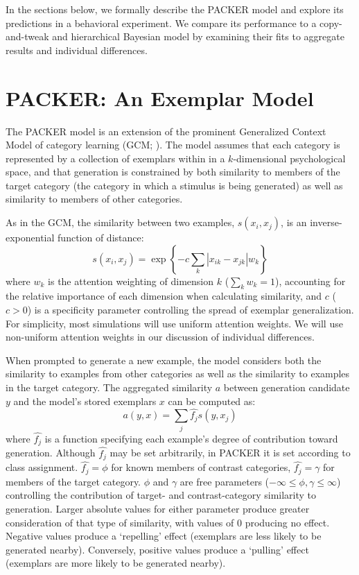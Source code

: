 \documentclass[10pt,letterpaper]{article}
\begin{document}
In the sections below, we formally describe the PACKER model and explore its predictions in a behavioral experiment. We compare its performance to a copy-and-tweak and hierarchical Bayesian model by examining their fits to aggregate results and individual differences.

\section{PACKER: An Exemplar Model}

The PACKER model is an extension of the prominent Generalized Context Model of category learning (GCM; \citealp{nosofsky1984choice}). The model assumes that each category is represented by a collection of exemplars within in a $k$-dimensional psychological space, and that generation is constrained by both similarity to members of the target category (the category in which a stimulus is being generated) as well as similarity to members of other categories. 

As in the GCM, the similarity between two examples, $s\left(x_i, x_j\right)$, is an inverse-exponential function of distance:
\begin{equation}
  s\left(x_i,x_j\right) = \exp \left\{ -c \sum_{k}{ \left| x_{ik} - x_{jk} \right|}w_k \right\}
  \label{eq:similarity}
\end{equation}
where $w_k$ is the attention weighting of dimension $k$ ($\sum_k{w_k} = 1$), accounting for the relative importance of each dimension when calculating similarity, and $c$ ($c>0$) is a specificity parameter controlling the spread of exemplar generalization. For simplicity, most simulations will use uniform attention weights. We will use non-uniform attention weights in our discussion of individual differences.  


When prompted to generate a new example, the model considers both the similarity to examples from other categories as well as the similarity to examples in the target category. The aggregated similarity $a$ between generation candidate $y$ and the model's stored exemplars $x$ can be computed as:
\begin{equation}
  a(y, x) = \sum_j{\hat{f_j} s(y, x_j)}
  \label{eq:packer-ss}
\end{equation}
where $\hat{f_j}$ is a function specifying each example's degree of contribution toward generation. Although $\hat{f_j}$ may be set arbitrarily, in PACKER it is set according to class assignment. $\hat{f_j} = \phi$ for known members of contrast categories, $\hat{f_j} = \gamma$ for members of the target category. $\phi$ and $\gamma$ are free parameters ($-\infty \leq \phi, \gamma \leq \infty$) controlling the contribution of target- and contrast-category similarity to generation. Larger absolute values for either parameter produce greater consideration of that type of similarity, with values of 0 producing no effect. Negative values produce a `repelling' effect (exemplars are less likely to be generated nearby). Conversely, positive values produce a `pulling' effect (exemplars are more likely to be generated nearby). 
\end{document}
